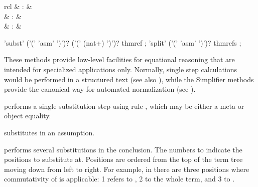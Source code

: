 \begin{isabellebody}
\begin{isamarkuptext}
\begin{descr}
  \end{descr}%
\end{isamarkuptext}%
\isamarkuptrue%
%
\isamarkuptrue%
%
\begin{isamarkuptext}%
\begin{matharray}{rcl}
    \hypertarget{method.subst}{\hyperlink{method.subst}{\mbox{}}} & : & \isarmeth \\
    \hypertarget{method.hypsubst}{\hyperlink{method.hypsubst}{\mbox{}}} & : & \isarmeth \\
    \hypertarget{method.split}{\hyperlink{method.split}{\mbox{}}} & : & \isarmeth \\
  \end{matharray}

  \begin{rail}
    'subst' ('(' 'asm' ')')? ('(' (nat+) ')')? thmref
    ;
    'split' ('(' 'asm' ')')? thmrefs
    ;
  \end{rail}

  These methods provide low-level facilities for equational reasoning
  that are intended for specialized applications only.  Normally,
  single step calculations would be performed in a structured text
  (see also ), while the Simplifier methods
  provide the canonical way for automated normalization (see
  ).

  \begin{descr}

  \item [\hyperlink{method.subst}{\mbox{\isa{subst}}}~\isa{eq}] performs a single substitution
  step using rule , which may be either a meta or object
  equality.

  \item [\hyperlink{method.subst}{\mbox{\isa{subst}}}~\isa{{\isachardoublequote}{\isacharparenleft}asm{\isacharparenright}\ eq{\isachardoublequote}}] substitutes in an
  assumption.

  \item [\hyperlink{method.subst}{\mbox{\isa{subst}}}~\isa{{\isachardoublequote}{\isacharparenleft}i\ {\isasymdots}\ j{\isacharparenright}\ eq{\isachardoublequote}}] performs several
  substitutions in the conclusion. The numbers  to 
  indicate the positions to substitute at.  Positions are ordered from
  the top of the term tree moving down from left to right. For
  example, in  there are three positions
  where commutativity of \isa{{\isachardoublequote}{\isacharplus}{\isachardoublequote}} is applicable: 1 refers to
  , 2 to the whole term, and 3 to .


\end{descr}
\end{isamarkuptext}
\end{isabellebody}
